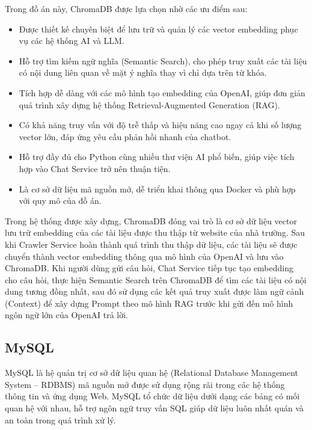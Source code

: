 \documentclass[../DoAn.tex]{subfiles}
\begin{document}
Trong đồ án này, ChromaDB được lựa chọn nhờ các ưu điểm sau:

\begin{itemize}
    \item Được thiết kế chuyên biệt để lưu trữ và quản lý các vector embedding phục vụ các hệ thống AI và LLM.

    \item Hỗ trợ tìm kiếm ngữ nghĩa (Semantic Search), cho phép truy xuất các tài liệu có nội dung liên quan về mặt ý nghĩa thay vì chỉ dựa trên từ khóa.

    \item Tích hợp dễ dàng với các mô hình tạo embedding của OpenAI, giúp đơn giản quá trình xây dựng hệ thống Retrieval-Augmented Generation (RAG).

    \item Có khả năng truy vấn với độ trễ thấp và hiệu năng cao ngay cả khi số lượng vector lớn, đáp ứng yêu cầu phản hồi nhanh của chatbot.

    \item Hỗ trợ đầy đủ cho Python cùng nhiều thư viện AI phổ biến, giúp việc tích hợp vào Chat Service trở nên thuận tiện.

    \item Là cơ sở dữ liệu mã nguồn mở, dễ triển khai thông qua Docker và phù hợp với quy mô của đồ án.
\end{itemize}

Trong hệ thống được xây dựng, ChromaDB đóng vai trò là cơ sở dữ liệu vector lưu trữ embedding của các tài liệu được thu thập từ website của nhà trường. Sau khi Crawler Service hoàn thành quá trình thu thập dữ liệu, các tài liệu sẽ được chuyển thành vector embedding thông qua mô hình của OpenAI và lưu vào ChromaDB. Khi người dùng gửi câu hỏi, Chat Service tiếp tục tạo embedding cho câu hỏi, thực hiện Semantic Search trên ChromaDB để tìm các tài liệu có nội dung tương đồng nhất, sau đó sử dụng các kết quả truy xuất được làm ngữ cảnh (Context) để xây dựng Prompt theo mô hình RAG trước khi gửi đến mô hình ngôn ngữ lớn của OpenAI trả lời.

\subsection{MySQL}

MySQL là hệ quản trị cơ sở dữ liệu quan hệ (Relational Database Management System -- RDBMS) mã nguồn mở được sử dụng rộng rãi trong các hệ thống thông tin và ứng dụng Web. MySQL tổ chức dữ liệu dưới dạng các bảng có mối quan hệ với nhau, hỗ trợ ngôn ngữ truy vấn SQL giúp dữ liệu luôn nhất quán và an toàn trong quá trình xử lý.
\end{document}
